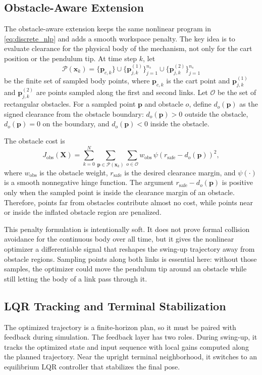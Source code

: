 \documentclass[conference]{IEEEtran}
\begin{document}
\subsection{Obstacle-Aware Extension}
The obstacle-aware extension keeps the same nonlinear program in \eqref{eq:discrete_nlp} and adds a smooth workspace penalty. The key idea is to evaluate clearance for the physical body of the mechanism, not only for the cart position or the pendulum tip. At time step $k$, let
\begin{equation}
\mathcal{P}(\bm{x}_k)
=
\{\bm{p}_{c,k}\}
\cup
\{\bm{p}^{(1)}_{j,k}\}_{j=1}^{n_s}
\cup
\{\bm{p}^{(2)}_{j,k}\}_{j=1}^{n_s}
\end{equation}
be the finite set of sampled body points, where $\bm{p}_{c,k}$ is the cart point and $\bm{p}^{(1)}_{j,k}$ and $\bm{p}^{(2)}_{j,k}$ are points sampled along the first and second links. Let $\mathcal{O}$ be the set of rectangular obstacles. For a sampled point $\bm{p}$ and obstacle $o$, define $d_o(\bm{p})$ as the signed clearance from the obstacle boundary: $d_o(\bm{p})>0$ outside the obstacle, $d_o(\bm{p})=0$ on the boundary, and $d_o(\bm{p})<0$ inside the obstacle.

The obstacle cost is
\begin{equation}
J_{\mathrm{obs}}(\bm{X})
=
\sum_{k=0}^{N}
\sum_{\bm{p}\in\mathcal{P}(\bm{x}_k)}
\sum_{o\in\mathcal{O}}
w_{\mathrm{obs}}\,
\psi\!\left(r_{\mathrm{safe}}-d_o(\bm{p})\right)^2 ,
\label{eq:obstaclecost}
\end{equation}
where $w_{\mathrm{obs}}$ is the obstacle weight, $r_{\mathrm{safe}}$ is the desired clearance margin, and $\psi(\cdot)$ is a smooth nonnegative hinge function. The argument $r_{\mathrm{safe}}-d_o(\bm{p})$ is positive only when the sampled point is inside the clearance margin of an obstacle. Therefore, points far from obstacles contribute almost no cost, while points near or inside the inflated obstacle region are penalized.

This penalty formulation is intentionally soft. It does not prove formal collision avoidance for the continuous body over all time, but it gives the nonlinear optimizer a differentiable signal that reshapes the swing-up trajectory away from obstacle regions. Sampling points along both links is essential here: without those samples, the optimizer could move the pendulum tip around an obstacle while still letting the body of a link pass through it.

\subsection{LQR Tracking and Terminal Stabilization}
The optimized trajectory is a finite-horizon plan, so it must be paired with feedback during simulation. The feedback layer has two roles. During swing-up, it tracks the optimized state and input sequence with local gains computed along the planned trajectory. Near the upright terminal neighborhood, it switches to an equilibrium LQR controller that stabilizes the final pose.
\end{document}
